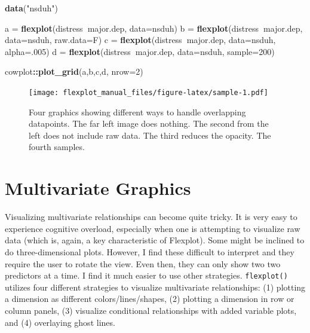 \documentclass[,]{book}
\newenvironment{Shaded}{\begin{snugshade}}{\end{snugshade}}
\newcommand{\KeywordTok}[1]{\textcolor[rgb]{0.13,0.29,0.53}{\textbf{#1}}}
\newcommand{\DataTypeTok}[1]{\textcolor[rgb]{0.13,0.29,0.53}{#1}}
\newcommand{\DecValTok}[1]{\textcolor[rgb]{0.00,0.00,0.81}{#1}}
\newcommand{\StringTok}[1]{\textcolor[rgb]{0.31,0.60,0.02}{#1}}
\newcommand{\OperatorTok}[1]{\textcolor[rgb]{0.81,0.36,0.00}{\textbf{#1}}}
\newcommand{\NormalTok}[1]{#1}
\begin{document}
\begin{Shaded}
\begin{Highlighting}[]
\KeywordTok{data}\NormalTok{(}\StringTok{"nsduh"}\NormalTok{)}

\NormalTok{a =}\StringTok{ }\KeywordTok{flexplot}\NormalTok{(distress}\OperatorTok{~}\NormalTok{major.dep, }\DataTypeTok{data=}\NormalTok{nsduh)}
\NormalTok{b =}\StringTok{ }\KeywordTok{flexplot}\NormalTok{(distress}\OperatorTok{~}\NormalTok{major.dep, }\DataTypeTok{data=}\NormalTok{nsduh, }\DataTypeTok{raw.data=}\NormalTok{F)}
\NormalTok{c =}\StringTok{ }\KeywordTok{flexplot}\NormalTok{(distress}\OperatorTok{~}\NormalTok{major.dep, }\DataTypeTok{data=}\NormalTok{nsduh, }\DataTypeTok{alpha=}\NormalTok{.}\DecValTok{005}\NormalTok{)}
\NormalTok{d =}\StringTok{ }\KeywordTok{flexplot}\NormalTok{(distress}\OperatorTok{~}\NormalTok{major.dep, }\DataTypeTok{data=}\NormalTok{nsduh, }\DataTypeTok{sample=}\DecValTok{200}\NormalTok{)}

\NormalTok{cowplot}\OperatorTok{::}\KeywordTok{plot_grid}\NormalTok{(a,b,c,d, }\DataTypeTok{nrow=}\DecValTok{2}\NormalTok{)}
\end{Highlighting}
\end{Shaded}

\begin{figure}
\centering
\texttt{[image: flexplot\_manual\_files/figure-latex/sample-1.pdf]}
\caption{\label{fig:sample}Four graphics showing different ways to handle
overlapping datapoints. The far left image does nothing. The second from
the left does not include raw data. The third reduces the opacity. The
fourth samples.}
\end{figure}

\chapter*{Multivariate Graphics}\label{multivariate-graphics}

Visualizing multivariate relationships can become quite tricky. It is
very easy to experience cognitive overload, especially when one is
attempting to visualize raw data (which is, again, a key characteristic
of Flexplot). Some might be inclined to do three-dimensional plots.
However, I find these difficult to interpret and they require the user
to rotate the view. Even then, they can only show two two predictors at
a time. I find it much easier to use other strategies.
\texttt{flexplot()} utilizes four different strategies to visualize
multivariate relationships: (1) plotting a dimension as different
colors/lines/shapes, (2) plotting a dimension in row or column panels,
(3) visualize conditional relationships with added variable plots, and
(4) overlaying ghost lines.
\end{document}
